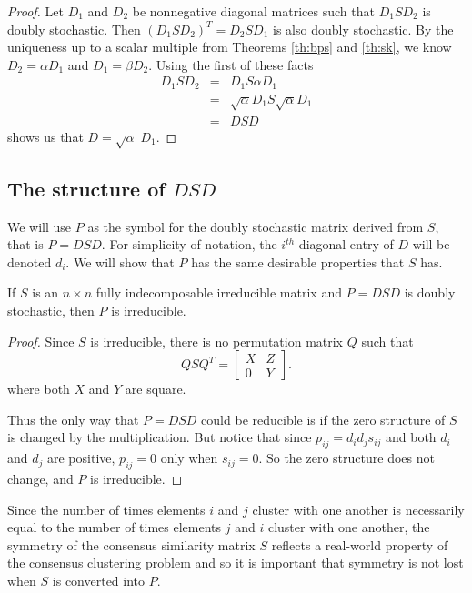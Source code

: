 \documentclass[final]{siamltex}
\begin{document}
\begin{proof}
Let $D_{1}$ and $D_{2}$ be nonnegative diagonal matrices such that $D_{1}SD_{2}$ is doubly stochastic. Then $(D_{1}SD_{2})^{T} =  D_{2}SD_{1}$ is also doubly stochastic. By the uniqueness up to a scalar multiple from Theorems \ref{th:bps} and \ref{th:sk}, we know $D_{2}=\alpha D_{1}$ and $D_{1}=\beta D_{2}$. Using the first of these facts
\begin{eqnarray*}
D_{1}SD_{2} &=& D_{1}S\alpha D_{1} \\
&=& \sqrt{\alpha}D_{1}S\sqrt{\alpha}D_{1} \\
&=& DSD
\end{eqnarray*}
shows us that $D = \sqrt{\alpha}\;D_{1}$.
\end{proof}

\subsection{The structure of  $DSD$} \label{sec:dsd}

We will use $P$ as the symbol for the doubly stochastic matrix derived from $S$, that is $P=DSD$. For simplicity of notation, the $i^{th}$ diagonal entry of $D$ will be denoted $d_{i}$. We will show that $P$ has the same desirable properties that $S$ has. 

\begin{lemma} 
If $S$ is an $n \times n$ fully indecomposable irreducible matrix and $P=DSD$ is doubly stochastic, then $P$ is irreducible.
\end{lemma}

\begin{proof}
Since $S$ is irreducible, there is no permutation matrix $Q$ such that
\[
QSQ^{T} = 
\left[
\begin{array}{cc}
 X & Z     \\
 0 &   Y   
\end{array}
\right].
\]
where both $X$ and $Y$ are square.

Thus the only way that $P=DSD$ could be reducible is if the zero structure of $S$ is changed by the multiplication. But notice that since $p_{ij} = d_{i}d_{j}s_{ij}$ and both $d_{i}$ and $d_{j}$ are positive, $p_{ij}=0$ only when $s_{ij}=0$. So the zero structure does not change, and $P$ is irreducible. 
\end{proof}

Since the number of times elements $i$ and $j$ cluster with one another is necessarily equal to the number of times elements $j$ and $i$ cluster with one another, the symmetry of the consensus similarity matrix $S$ reflects a real-world property of the consensus clustering problem and so it is important that symmetry is not lost when $S$ is converted into $P$. 
\end{document}
